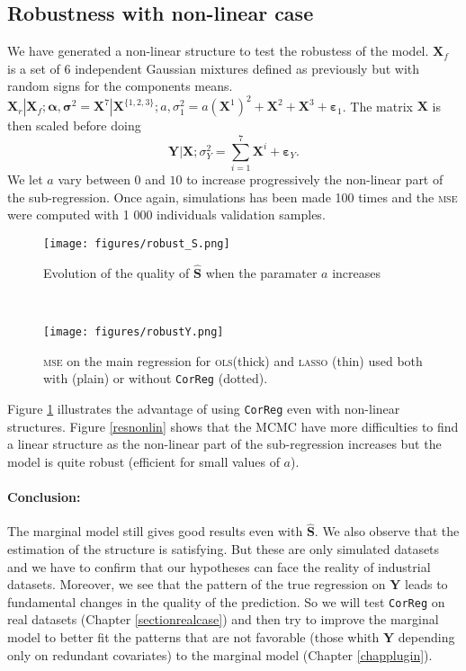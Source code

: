 \documentclass[12pt,a4paper]{report}
\begin{document}
\subsection{Robustness with non-linear case}

We have generated a non-linear structure to test the robustess of the model. $\boldsymbol{X}_f$ is a set of 6 independent Gaussian mixtures defined as previously but with random signs for the components means. $\boldsymbol{X}_r|\boldsymbol{X}_f;\boldsymbol{\alpha},\boldsymbol{\sigma}^2=\boldsymbol{X}^7|\boldsymbol{X}^{\{1,2,3\}};a,\sigma_1^2=a(\boldsymbol{X}^1)^2+\boldsymbol{X}^2+\boldsymbol{X}^3+ \boldsymbol{\varepsilon}_1$. The matrix $\boldsymbol{X}$ is then scaled before doing $$\boldsymbol{Y}|\boldsymbol{X};\sigma_Y^2=\sum_{i=1}^7\boldsymbol{X}^i+\boldsymbol{\varepsilon}_Y.$$ We let $a$ vary between $0$ and $10$ to increase progressively the non-linear part of the sub-regression. Once again, simulations has been made 100 times and the \textsc{mse} were computed with 1 000 individuals validation samples.

 \begin{figure}[h!] 
	\begin{minipage}[l]{.48\linewidth}
			\texttt{[image: figures/robust\_S.png]} 
			\caption{Evolution of the quality of $\hat{\boldsymbol{S}}$ when the paramater $a$ increases}\label{resnonlin}
	\end{minipage} \
   \begin{minipage}[r]{.48\linewidth}
			\texttt{[image: figures/robustY.png]} 
			\caption{\textsc{mse} on the main regression for \textsc{ols}(thick) and \textsc{lasso} (thin) used both with (plain) or without {\tt CorReg} (dotted).}\label{MSEnonlin}
   \end{minipage}
\end{figure}
Figure \ref{MSEnonlin} illustrates the advantage of using {\tt CorReg} even with non-linear structures. Figure \ref{resnonlin} shows that the MCMC have more difficulties to find a linear structure as the non-linear part of the sub-regression increases but the model is quite robust (efficient for small values of $a$).

	\FloatBarrier	

	\paragraph{Conclusion:} The marginal model still gives good results even with $\hat{\boldsymbol{S}}$. We also observe that the estimation of the structure is satisfying. But these are only simulated datasets and we have to confirm that our hypotheses can face the reality of industrial datasets. Moreover, we see that the pattern of the true regression on $\boldsymbol{Y}$ leads to fundamental changes in the quality of the prediction.	So we will test {\tt CorReg} on real datasets (Chapter \ref{sectionrealcase}) and then try to improve the marginal model to better fit the patterns that are not favorable (those whith $\boldsymbol{Y}$ depending only on redundant covariates) to the marginal model (Chapter \ref{chapplugin}).
		
\end{document}
